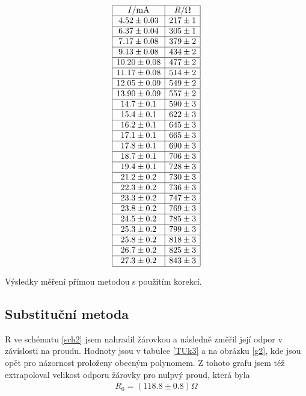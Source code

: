 \documentclass[a4paper,12pt]{article}
\begin{document}
\begin{table}
$$
\begin{array}{|c|c|}
\hline
I/\mbox{mA}&    R/\Omega \\ \hline
4.52\pm 0.03&217\pm 1\\ \hline
6.37\pm 0.04&305\pm 1\\ \hline
7.17\pm 0.08&379\pm 2\\ \hline
9.13\pm 0.08&434\pm 2\\ \hline
10.20\pm 0.08&477\pm 2\\ \hline
11.17\pm 0.08&514\pm 2\\ \hline
12.05\pm 0.09&549\pm 2\\ \hline
13.90\pm 0.09&557\pm 2\\ \hline
14.7\pm 0.1&590\pm 3\\ \hline
15.4\pm 0.1&622\pm 3\\ \hline
16.2\pm 0.1&645\pm 3\\ \hline
17.1\pm 0.1&665\pm 3\\ \hline
17.8\pm 0.1&690\pm 3\\ \hline
18.7\pm 0.1&706\pm 3\\ \hline
19.4\pm 0.1&728\pm 3\\ \hline
21.2\pm 0.2&730\pm 3\\ \hline
22.3\pm 0.2&736\pm 3\\ \hline
23.3\pm 0.2&747\pm 3\\ \hline
23.8\pm 0.2&769\pm 3\\ \hline
24.5\pm 0.2&785\pm 3\\ \hline
25.3\pm 0.2&799\pm 3\\ \hline
25.8\pm 0.2&818\pm 3\\ \hline
26.7\pm 0.2&825\pm 3\\ \hline
27.3\pm 0.2&843\pm 3\\ \hline
\end{array}
$$
\caption{Výsledky měření přímou metodou s použitím korekcí.}
\label{TUk2}
\end{table}



\subsection{Substituční metoda}
R ve schématu \ref{sch2} jsem nahradil žárovkou a následně změřil její odpor v závislosti na proudu. Hodnoty jsou v tabulce \ref{TUk3} a na obrázku \ref{g2}, kde jsou opět 
pro názornost proloženy obecným polynomem. Z tohoto grafu jsem též extrapoloval velikost 
odporu žárovky pro nulpvý proud, která byla
\begin{eqnarray}
R_0=(118.8\pm0.8)\Omega
\end{eqnarray}
\end{document}
